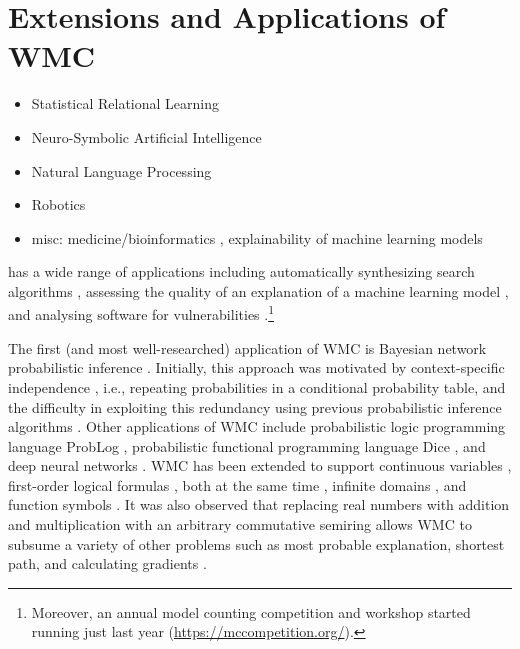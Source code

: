 \section{Extensions and Applications of WMC}

\begin{itemize}
\item Statistical Relational Learning
\item Neuro-Symbolic Artificial Intelligence
\item Natural Language Processing \citep{DBLP:conf/aaai/CarlsonBKSHM10,DBLP:conf/ijcai/DriesKDBR17}
\item Robotics \citep{DBLP:conf/icra/MoldovanMOSR12,DBLP:conf/iros/MoldovanR14}
\item misc: medicine/bioinformatics \citep{DBLP:conf/ilp/Corte-RealD017,de2013phenetic}, explainability of machine learning models \citep{DBLP:conf/aaai/BroeckLSS21}
\end{itemize}

has a wide range of applications including automatically synthesizing search algorithms \citep{DBLP:journals/corr/abs-2009-10877}, assessing the quality of an explanation of a machine learning model \citep{DBLP:conf/sat/NarodytskaSMIM19}, and analysing software for vulnerabilities \citep{DBLP:conf/sp/ZhouQRZ18}.\footnote{Moreover, an annual model counting competition and workshop started running just last year (\url{https://mccompetition.org/}).}

The first (and most well-researched)
application of WMC is Bayesian network probabilistic inference
\citep{DBLP:conf/ecai/BartKLM16,DBLP:conf/ijcai/ChaviraD05,DBLP:conf/sat/ChaviraD06,DBLP:conf/kr/Darwiche02,DBLP:conf/aaai/SangBK05}.
Initially, this approach was motivated by context-specific independence
\citep{DBLP:conf/uai/BoutilierFGK96}, i.e., repeating probabilities in a
conditional probability table, and the difficulty in exploiting this redundancy
using previous probabilistic inference algorithms
\citep{DBLP:conf/kr/Darwiche02}. Other applications of WMC include probabilistic
logic programming language ProbLog
\citep{DBLP:journals/tplp/FierensBRSGTJR15,DBLP:conf/aaai/VlasselaerKDMR16},
probabilistic functional programming language Dice
\citep{DBLP:journals/pacmpl/HoltzenBM20}, and deep neural networks
\citep{DBLP:conf/aaai/TsamouraHM21,DBLP:conf/icml/XuZFLB18}. WMC has been
extended to support continuous variables \citep{DBLP:conf/ijcai/BellePB15},
first-order logical formulas
\citep{DBLP:conf/ijcai/BroeckTMDR11,DBLP:journals/cacm/GogateD16}, both at the same time \citep{DBLP:conf/uai/FeldsteinB21}, infinite
domains \citep{DBLP:conf/aaai/Belle17}, and function symbols \citep{DBLP:conf/uai/Belle17}. It was also observed that replacing real
numbers with addition and multiplication with an arbitrary commutative semiring
allows WMC to subsume a variety of other problems such as most probable
explanation, shortest path, and calculating gradients
\citep{DBLP:journals/ijar/BelleR20,DBLP:journals/japll/KimmigBR17}.

